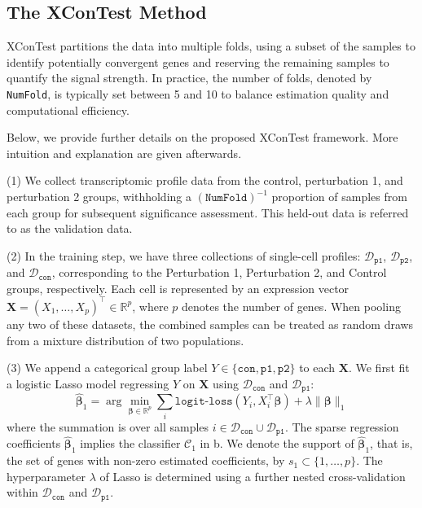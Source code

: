 \documentclass[11pt]{article}
\begin{document}
\subsection*{The XConTest Method}

XConTest partitions the data into multiple folds, using a subset of the samples to identify potentially convergent genes and reserving the remaining samples to quantify the signal strength. In practice, the number of folds, denoted by \texttt{NumFold}, is typically set between 5 and 10 to balance estimation quality and computational efficiency.

Below, we provide further details on the proposed XConTest framework. More intuition and explanation are given afterwards.

(1) We collect transcriptomic profile data from the control, perturbation 1, and perturbation 2 groups, withholding a $(\texttt{NumFold})^{-1}$ proportion of samples from each group for subsequent significance assessment. This held-out data is referred to as the validation data.

(2) In the training step, we have three collections of single-cell profiles: $\mathcal{D}_{\texttt{p1}}$, $\mathcal{D}_{\texttt{p2}}$, and $\mathcal{D}_{\texttt{con}}$, corresponding to the Perturbation 1, Perturbation 2, and Control groups, respectively. Each cell is represented by an expression vector $\bm{X}=(X_1,\ldots,X_p)^{\top}\in\mathbb{R}^p$, where $p$ denotes the number of genes. When pooling any two of these datasets, the combined samples can be treated as random draws from a mixture distribution of two populations.

(3) We append a categorical group label $Y\in\{\texttt{con}, \texttt{p1}, \texttt{p2}\}$ to each $\bm{X}$. We first fit a logistic Lasso model regressing $Y$ on $\bm{X}$ using $\mathcal{D}_{\texttt{con}}$ and $\mathcal{D}_{\texttt{p1}}$:
\begin{equation}\label{eq: C1 beta}
   \widehat{\bm \beta}_1 = \arg\min_{\bm{\beta}\in\mathbb{R}^p} \sum_{i} \texttt{logit-loss}(Y_i, X_i^\top \bm{\beta}) + \lambda \|\bm{\beta}\|_1 
\end{equation}
where the summation is over all samples $i\in \mathcal{D}_{\texttt{con}}\cup\mathcal{D}_{\texttt{p1}}$. The sparse regression coefficients $\widehat{\bm \beta}_1$ implies the classifier $\mathcal{C}_1$ in b. We denote the support of $\widehat{\bm{\beta}}_1$, that is, the set of genes with non-zero estimated coefficients, by $s_1 \subset \{1,\ldots,p\}$. The hyperparameter $\lambda$ of Lasso is determined using a further nested cross-validation within $\mathcal D_{\texttt{con}}$ and $\mathcal D_{\texttt{p1}}$.
\end{document}
